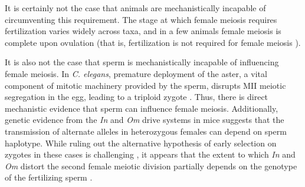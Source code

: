 \documentclass[12pt,letterpaper]{article}
\begin{document}
It is certainly not the case that animals are mechanistically incapable of circumventing this requirement.
The stage at which female meiosis requires fertilization varies widely across taxa, and in a few animals  
	female meiosis is complete upon ovulation (that is, fertilization is not required for female meiosis \citep[e.g. Table 1 in 
][]{Masui_book}). 

It is also not the case that sperm is mechanistically incapable of influencing female meiosis.
In \emph{C. elegans}, premature deployment of the aster, a vital component of mitotic
machinery provided by the sperm, disrupts MII meiotic segregation
in the egg, leading to a triploid zygote \citep{McNally2012}. 
Thus, there is direct mechanistic evidence that sperm can influence female meiosis.
 Additionally, genetic evidence from the \emph{In} and \emph{Om}  drive systems in mice suggests that the 
 transmission of alternate alleles in heterozygous females can depend on sperm haplotype.  
 While ruling out the alternative hypothesis of early selection on zygotes in these cases is challenging  \citep[see pages
52-54 in][]{Burt2006}, it appears that the extent to which \emph{In} and \emph{Om} distort the second female meiotic division partially depends on the genotype of the fertilizing sperm \citep{Agulnik1993,Wu2005}.  
\end{document}
